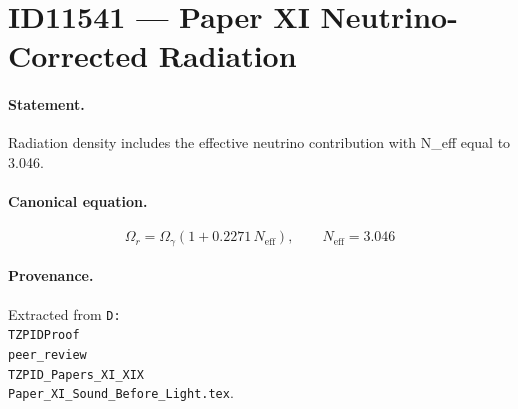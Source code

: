 \section*{ID11541 --- Paper XI Neutrino-Corrected Radiation}

\paragraph{Statement.}
Radiation density includes the effective neutrino contribution with N_eff equal to 3.046.

\paragraph{Canonical equation.}
\[
\Omega_r=\Omega_\gamma(1+0.2271\,N_{\mathrm{eff}}),\qquad N_{\mathrm{eff}}=3.046
\]

\paragraph{Provenance.}
Extracted from \texttt{D:\\TZPIDProof\\peer\_review\\TZPID\_Papers\_XI\_XIX\\Paper\_XI\_Sound\_Before\_Light.tex}.
